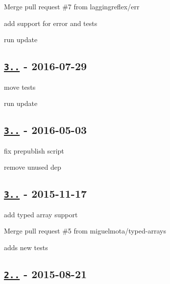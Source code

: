 \begin{DoxyItemize}
\item Merge pull request \#7 from laggingreflex/err
\item add support for {\ttfamily error} and tests
\item run update
\end{DoxyItemize}

\subsection*{\href{https://github.com/jonschlinkert/kind-of/compare/3.0.3...3.0.4}{\tt 3..} -\/ 2016-\/07-\/29}


\begin{DoxyItemize}
\item move tests
\item run update
\end{DoxyItemize}

\subsection*{\href{https://github.com/jonschlinkert/kind-of/compare/3.0.0...3.0.3}{\tt 3..} -\/ 2016-\/05-\/03}


\begin{DoxyItemize}
\item fix prepublish script
\item remove unused dep
\end{DoxyItemize}

\subsection*{\href{https://github.com/jonschlinkert/kind-of/compare/2.0.1...3.0.0}{\tt 3..} -\/ 2015-\/11-\/17}


\begin{DoxyItemize}
\item add typed array support
\item Merge pull request \#5 from miguelmota/typed-\/arrays
\item adds new tests
\end{DoxyItemize}

\subsection*{\href{https://github.com/jonschlinkert/kind-of/compare/2.0.0...2.0.1}{\tt 2..} -\/ 2015-\/08-\/21}


